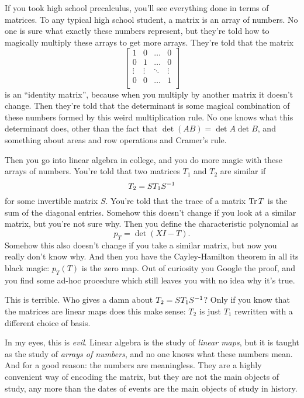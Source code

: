 If you took high school precalculus, you'll see everything done in terms of matrices.
To any typical high school student, a matrix is an array of numbers.
No one is sure what exactly these numbers represent,
but they're told how to magically multiply these arrays to get more arrays. 
They're told that the matrix
\[ \begin{bmatrix}
		1 & 0 & \dots & 0 \\
		0 & 1 & \dots & 0 \\
		\vdots & \vdots & \ddots & \vdots \\
		0 & 0 & \dots & 1 \\
	\end{bmatrix} \]
is an ``identity matrix'', because when you multiply
by another matrix it doesn't change.
Then they're told that the determinant is some magical combination of these
numbers formed by this weird multiplication rule.
No one knows what this determinant does,
other than the fact that $\det(AB) = \det A \det B$,
and something about areas and row operations and Cramer's rule.

Then you go into linear algebra in college, and you do more magic
with these arrays of numbers.
You're told that two matrices $T_1$ and $T_2$ are similar if
\[ T_2 = ST_1S^{-1} \] for some invertible matrix $S$.
You're told that the trace of a matrix $\operatorname{Tr} T$ is the sum of the diagonal entries.
Somehow this doesn't change if you look at a similar matrix,
but you're not sure why.
Then you define the characteristic polynomial as \[ p_T = \det (XI - T). \]
Somehow this also doesn't change if you take a similar matrix,
but now you really don't know why.
And then you have the Cayley-Hamilton theorem in all its black magic:
$p_T(T)$ is the zero map.  Out of curiosity you Google the proof,
and you find some ad-hoc procedure which still leaves you
with no idea why it's true.

This is terrible. Who gives a damn about $T_2 = ST_1S^{-1}$?
Only if you know that the matrices are linear maps does this make sense:
$T_2$ is just $T_1$ rewritten with a different choice of basis.

In my eyes, this is \emph{evil}.
Linear algebra is the study of \emph{linear maps},
but it is taught as the study of \emph{arrays of numbers},
and no one knows what these numbers mean.
And for a good reason: the numbers are meaningless.
They are a highly convenient way of encoding the matrix,
but they are not the main objects of study,
any more than the dates of events are the main objects of study in history.

